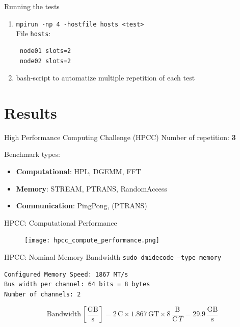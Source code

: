 \documentclass[10pt]{beamer}
\begin{document}
\begin{frame}[fragile]{Running the tests}
  \begin{enumerate}
    \item \texttt{mpirun -np 4 -hostfile hosts <test>}\vspace{0.5cm}
 \\File \texttt{hosts}:
 \begin{verbatim}
 node01 slots=2
 node02 slots=2 
 \end{verbatim}
    \item bash-script to automatize multiple repetition of each test
  \end{enumerate}
 
\end{frame}

\section{Results}

\begin{frame}{High Performance Computing Challenge (HPCC)}
  Number of repetition: \textbf{3}

  Benchmark types:

\begin{itemize}

  \item \textbf{Computational}: HPL, DGEMM, FFT    
  \item \textbf{Memory}:   STREAM, PTRANS, RandomAccess
  \item \textbf{Communication}: PingPong, (PTRANS)

\end{itemize}

\end{frame}

\begin{frame}{HPCC: Computational Performance}
\begin{figure}
  \centering
  \texttt{[image: hpcc\_compute\_performance.png]}
\end{figure}

\end{frame}

\begin{frame}[fragile]{HPCC: Nominal Memory Bandwidth}
\texttt{sudo dmidecode --type memory}  
\begin{verbatim}
Configured Memory Speed: 1867 MT/s
Bus width per channel: 64 bits = 8 bytes
Number of channels: 2
\end{verbatim}
$$
\text{Bandwidth}\, \left[\frac{\text{GB}}{\text{s}}\right] = \text{2}\, \text{C} \times 1.867\, \text{GT} \times 8\, \frac{\text{B}}{\text{C}\,{T}} = 29.9\,\frac{\text{GB}}{\text{s}}
$$

\end{frame}
\end{document}
